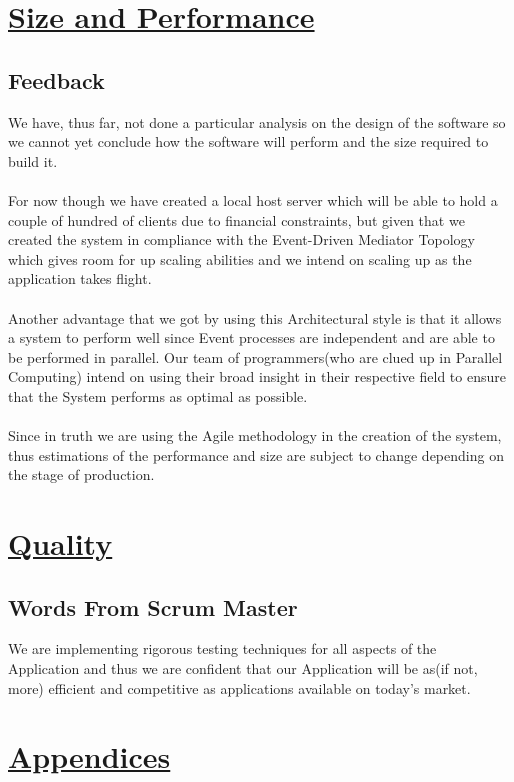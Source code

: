 \documentclass{article}
\begin{document}
\pagebreak
\section{\underline{Size and Performance}}
\subsection{Feedback}

We have, thus far, not done a particular analysis on the design of the software so we cannot  yet conclude how the software will perform and the size required to build it.\\\\ For now though we have created a local host server which will be able to hold a couple of hundred of clients due to financial constraints, but given that we created the system in compliance with the Event-Driven Mediator Topology which gives room for up scaling abilities and we intend on scaling up as the application takes flight.\\\\ Another advantage that we got by using this Architectural style is that it allows a system to perform well since Event processes are independent and are able to be performed in parallel. Our team of programmers(who are clued up in Parallel Computing) intend on using their broad insight in their respective field to ensure that the System performs as optimal as possible.\\\\ Since in truth we are using the Agile methodology in the creation of the system, thus estimations of the performance and size are subject to change depending on the stage of production. 
\pagebreak
\section{\underline{Quality}}
\subsection{{Words From Scrum Master}}

We are implementing rigorous testing techniques for all aspects of the Application and thus we are confident that our Application will be as(if not, more) efficient and competitive as applications available on today's market.
\pagebreak
\section{\underline{Appendices }}
\end{document}
